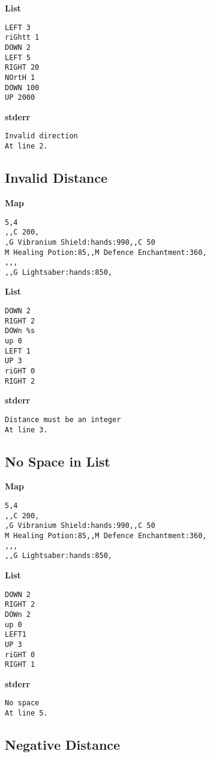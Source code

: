 \documentclass{article}
\begin{document}
\textbf{List}
\begin{lstlisting}
LEFT 3
riGhtt 1
DOWN 2
LEFT 5
RIGHT 20
NOrtH 1
DOWN 100
UP 2000
\end{lstlisting}
\pagebreak

\textbf{stderr}
\begin{lstlisting}
Invalid direction
At line 2.
\end{lstlisting}

\subsection{Invalid Distance}

\quad \textbf{Map}
\begin{lstlisting}
5,4
,,C 200,
,G Vibranium Shield:hands:990,,C 50
M Healing Potion:85,,M Defence Enchantment:360,
,,,
,,G Lightsaber:hands:850,
\end{lstlisting}

\textbf{List}
\begin{lstlisting}
DOWN 2
RIGHT 2
DOWn %s
up 0
LEFT 1
UP 3
riGHT 0
RIGHT 2
\end{lstlisting}
\pagebreak

\textbf{stderr}
\begin{lstlisting}
Distance must be an integer
At line 3.
\end{lstlisting}

\subsection{No Space in List}

\quad \textbf{Map}
\begin{lstlisting}
5,4
,,C 200,
,G Vibranium Shield:hands:990,,C 50
M Healing Potion:85,,M Defence Enchantment:360,
,,,
,,G Lightsaber:hands:850,
\end{lstlisting}

\textbf{List}
\begin{lstlisting}
DOWN 2
RIGHT 2
DOWn 2
up 0
LEFT1
UP 3
riGHT 0
RIGHT 1
\end{lstlisting}
\pagebreak

\textbf{stderr}
\begin{lstlisting}
No space
At line 5.
\end{lstlisting}

\subsection{Negative Distance}
\end{document}
